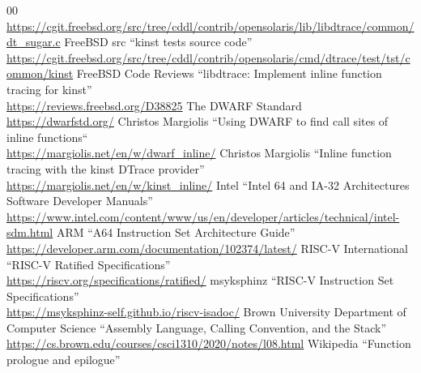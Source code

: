 \documentclass[12pt]{article}
\begin{document}
\begin{thebibliography}{00}
	\href{https://cgit.freebsd.org/src/tree/cddl/contrib/opensolaris/lib/libdtrace/common/dt\_sugar.c}
	{https://cgit.freebsd.org/src/tree/cddl/contrib/opensolaris/lib/libdtrace/common/dt\_sugar.c}
 FreeBSD src ``kinst tests source code'' \\
	\href{https://cgit.freebsd.org/src/tree/cddl/contrib/opensolaris/cmd/dtrace/test/tst/common/kinst}
	{https://cgit.freebsd.org/src/tree/cddl/contrib/opensolaris/cmd/dtrace/test/tst/common/kinst}
 FreeBSD Code Reviews ``libdtrace: Implement inline function tracing for kinst'' \\
	\href{https://reviews.freebsd.org/D38825}{https://reviews.freebsd.org/D38825}
 The DWARF Standard \\
	\href{https://dwarfstd.org/}{https://dwarfstd.org/}
 Christos Margiolis ``Using DWARF to find call sites of
	inline functions`` \\
	\href{https://margiolis.net/en/w/dwarf\_inline/}{https://margiolis.net/en/w/dwarf\_inline/}
 Christos Margiolis ``Inline function tracing with the
	kinst DTrace provider'' \\
	\href{https://margiolis.net/en/w/kinst\_inline/}{https://margiolis.net/en/w/kinst\_inline/}
 Intel ``Intel 64 and IA-32 Architectures Software Developer Manuals'' \\
	\href{https://www.intel.com/content/www/us/en/developer/articles/technical/intel-sdm.html}{https://www.intel.com/content/www/us/en/developer/articles/technical/intel-sdm.html}
 ARM ``A64 Instruction Set Architecture Guide'' \\
	\href{https://developer.arm.com/documentation/102374/latest/}{https://developer.arm.com/documentation/102374/latest/}
 RISC-V International ``RISC-V Ratified Specifications'' \\
	\href{https://riscv.org/specifications/ratified/}{https://riscv.org/specifications/ratified/}
 msyksphinz ``RISC-V Instruction Set Specifications'' \\
	\href{https://msyksphinz-self.github.io/riscv-isadoc/}{https://msyksphinz-self.github.io/riscv-isadoc/}
 Brown University Department of Computer Science ``Assembly
	Language, Calling Convention, and the Stack'' \\
	\href{https://cs.brown.edu/courses/csci1310/2020/notes/l08.html}{https://cs.brown.edu/courses/csci1310/2020/notes/l08.html}
 Wikipedia ``Function prologue and epilogue'' \\

\end{thebibliography}
\end{document}
